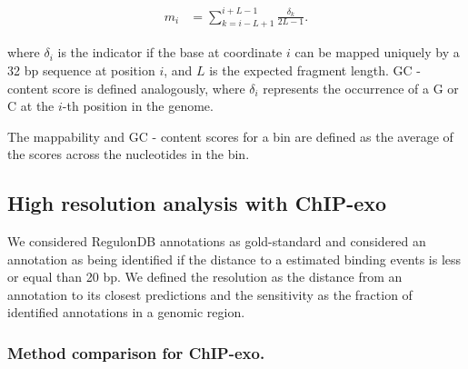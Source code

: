 \documentclass{bmcart}\usepackage[]{graphicx}\usepackage[]{color}
\begin{document}
\begin{align*}
  m_i &= \sum_{k = i - L +1}^{i + L - 1} \frac{\delta_k }{2L - 1}.
\end{align*}

where $\delta_i$ is the indicator if the base at coordinate $i$ can be
mapped uniquely by a 32 bp sequence at position $i$, and $L$ is the
expected fragment length. GC - content score is defined analogously,
where $\delta_i$ represents the occurrence of a G or C at the $i$-th
position in the genome. 

The mappability and GC - content scores for a bin are defined as the
average of the scores across the nucleotides in the bin.




\subsection*{High resolution analysis with ChIP-exo}

We considered RegulonDB \cite{regulondb} annotations as gold-standard
and considered an annotation as being identified if the distance to a
estimated binding events is less or equal than 20 bp. We
defined the resolution as the distance from an annotation to its
closest predictions and the sensitivity as the fraction of identified
annotations in a genomic region.

\subsubsection*{Method comparison for ChIP-exo.}
\end{document}
